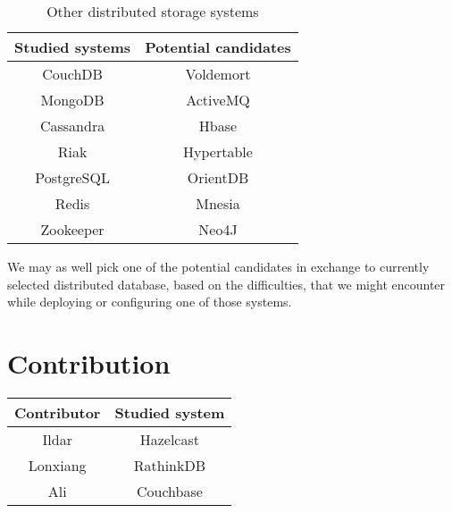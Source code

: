 \documentclass[a4paper]{article}
\begin{document}
\begin{table}
	\centering
	\begin{tabular}{|c|c|}
		\hline
		\rowcolor{light-gray} \textbf{Studied systems} & \textbf{Potential candidates} \\ \hline
		CouchDB & Voldemort  \\ \hline
		MongoDB & ActiveMQ  \\ \hline
		Cassandra & Hbase  \\ \hline
		Riak & Hypertable  \\ \hline
		PostgreSQL & OrientDB  \\ \hline
		Redis & Mnesia  \\ \hline
		Zookeeper & Neo4J  \\ \hline
	\end{tabular}
	\caption{Other distributed storage systems}
	\label{tab:cacndidates}
\end{table}

We may as well pick one of the potential candidates in exchange to currently selected distributed database, based on the difficulties, that we might encounter while deploying or configuring one of those systems.

\section*{Contribution}

\begin{table}[hb]
	\centering
	\begin{tabular}{|c|c|}
		\hline
		\rowcolor{light-gray} \textbf{Contributor} & \textbf{Studied system} \\ \hline
		Ildar & Hazelcast  \\ \hline
		Lonxiang & RathinkDB  \\ \hline
		Ali & Couchbase  \\ \hline
	\end{tabular}
\end{table}
\end{document}
